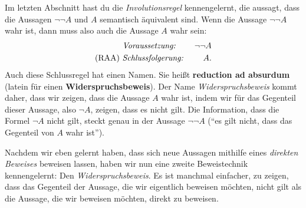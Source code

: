 \documentclass[../../main.tex]{subfiles}
\begin{document}
Im letzten Abschnitt hast du die \emph{Involutionsregel} kennengelernt, die aussagt, dass die Aussagen $\lnot \lnot A$ und $A$ semantisch äquivalent sind. Wenn die Aussage $\lnot\lnot A$ wahr ist, dann muss also auch die Aussage $A$ wahr sein:
\begin{align*}
    &\text{\emph{Voraussetzung:}}~&\lnot\lnot A\\
    \text{(RAA)}~&\text{\emph{Schlussfolgerung:}}~&A.
\end{align*}
Auch diese Schlussregel hat einen Namen. Sie heißt \textbf{reduction ad absurdum} (latein für einen \textbf{Widerspruchsbeweis}). Der Name \emph{Widerspruchsbeweis} kommt daher, dass wir zeigen, dass die Aussage $A$ wahr ist, indem wir für das Gegenteil dieser Aussage, also $\lnot A$, zeigen, dass es nicht gilt. Die Information, dass die Formel $\lnot A$ nicht gilt, steckt genau in der Aussage $\lnot\lnot A$ (\enquote{es gilt nicht, dass das Gegenteil von $A$ wahr ist}).

Nachdem wir eben gelernt haben, dass sich neue Aussagen mithilfe eines \emph{direkten Beweises} beweisen lassen, haben wir nun eine zweite Beweistechnik kennengelernt: Den \emph{Widerspruchsbeweis}. Es ist manchmal einfacher, zu zeigen, dass das Gegenteil der Aussage, die wir eigentlich beweisen möchten, nicht gilt als die Aussage, die wir beweisen möchten, direkt zu beweisen.
\end{document}
